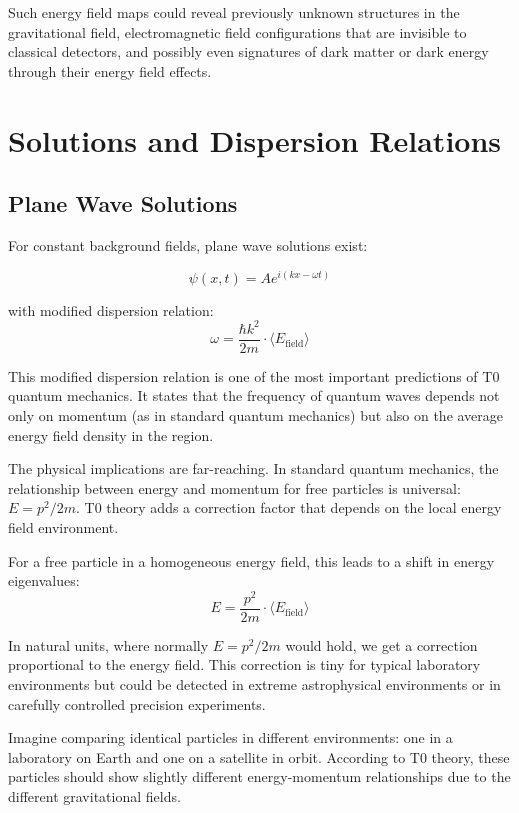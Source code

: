 \documentclass[12pt,a4paper]{article}
\theoremstyle{definition}
\theoremstyle{remark}
\begin{document}
Such energy field maps could reveal previously unknown structures in the gravitational field, electromagnetic field configurations that are invisible to classical detectors, and possibly even signatures of dark matter or dark energy through their energy field effects.

\section{Solutions and Dispersion Relations}

\subsection{Plane Wave Solutions}

For constant background fields, plane wave solutions exist:

\begin{equation}
	\psi(x,t) = A e^{i(kx - \omega t)}
	\label{eq:plane_wave}
\end{equation}

with modified dispersion relation:
\begin{equation}
	\boxed{\omega = \frac{\hbar k^2}{2m} \cdot \langle E_{\text{field}} \rangle}
	\label{eq:modified_dispersion}
\end{equation}

This modified dispersion relation is one of the most important predictions of T0 quantum mechanics. It states that the frequency of quantum waves depends not only on momentum (as in standard quantum mechanics) but also on the average energy field density in the region.

The physical implications are far-reaching. In standard quantum mechanics, the relationship between energy and momentum for free particles is universal: $E = p^2/2m$. T0 theory adds a correction factor that depends on the local energy field environment.

For a free particle in a homogeneous energy field, this leads to a shift in energy eigenvalues:
$$E = \frac{p^2}{2m} \cdot \langle E_{\text{field}} \rangle$$

In natural units, where normally $E = p^2/2m$ would hold, we get a correction proportional to the energy field. This correction is tiny for typical laboratory environments but could be detected in extreme astrophysical environments or in carefully controlled precision experiments.

Imagine comparing identical particles in different environments: one in a laboratory on Earth and one on a satellite in orbit. According to T0 theory, these particles should show slightly different energy-momentum relationships due to the different gravitational fields.
\end{document}

